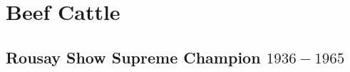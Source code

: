 \chapter{Beef Cattle}
\section[Supreme Champion]{Rousay Show Supreme Champion $1936 - 1965$}
\small

\normalsize
